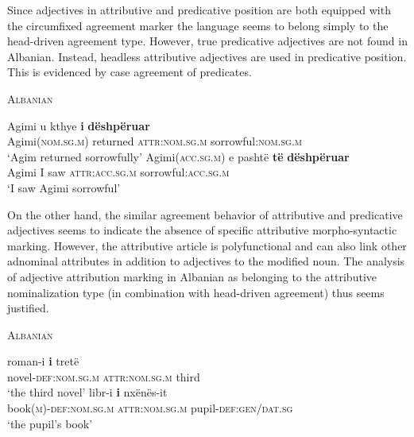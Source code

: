 Since adjectives in attributive and predicative position are both equipped with the circumfixed agreement marker the language seems to belong simply to the head-driven agreement type. However, true predicative adjectives are not found in Albanian. Instead, headless attributive adjectives are used in predicative position. This is evidenced by case agreement of predicates.
\begin{exe}
\ex \textsc{Albanian} \citep{demiraj1998}
\begin{xlist}
\ex
\gll	Agimi {u kthye} \textbf{i} \textbf{dëshpëruar}\\
	Agimi(\textsc{nom.sg.m}) returned \textsc{attr:nom.sg.m} sorrowful:\textsc{nom.sg.m}\\
\glt	‘Agim returned sorrowfully’
\ex
\gll	Agimi(\textsc{acc.sg.m}) e pashtë \textbf{të} \textbf{dëshpëruar}\\
	Agimi I saw \textsc{attr:acc.sg.m} sorrowful:\textsc{acc.sg.m}\\
\glt	‘I saw Agimi sorrowful’
\end{xlist}
\end{exe}
On the other hand, the similar agreement behavior of attributive and predicative adjectives seems to indicate the absence of specific attributive morpho-syntactic marking. However, the attributive article is polyfunctional and can also link other adnominal attributes in addition to adjectives to the modified noun. The analysis of adjective attribution marking in Albanian as belonging to the attributive nominalization type (in combination with head-driven agreement) thus seems justified.
\begin{exe}
\ex \textsc{Albanian} \citep{demiraj1998}
\begin{xlist}
\ex
\gll	roman-i 			\textbf{i} 			tretë\\
	novel-\textsc{def:nom.sg.m} \textsc{attr:nom.sg.m} third\\
\glt	‘the third novel’
\ex	
\gll	libr-i 	\textbf{i} nxënës-it\\
	book(\textsc{m})-\textsc{def:nom.sg.m} \textsc{attr:nom.sg.m} pupil-\textsc{def:gen/dat.sg}\\
\glt	‘the pupil's book’
\end{xlist}
\end{exe}

